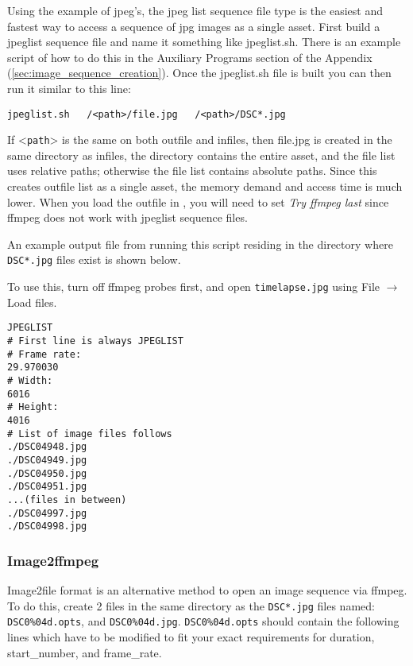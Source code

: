 Using the example of jpeg’s, the jpeg list sequence file type is the easiest and fastest way to access a sequence of jpg images as a single asset.  First build a jpeglist sequence file and name it something like jpeglist.sh.  There is an example script of how to do this in the Auxiliary Programs section of the Appendix (\ref{sec:image_sequence_creation}).  Once the jpeglist.sh file is built you can then run it similar to this line:

\begin{lstlisting}[style=sh]
jpeglist.sh   /<path>/file.jpg   /<path>/DSC*.jpg
\end{lstlisting}

\vspace*{1ex} \noindent If <\texttt{path}> is the same on both outfile and infiles, then file.jpg is created in the same directory as infiles, the directory contains the entire asset, and the file list uses relative paths; otherwise the file list contains absolute paths.   Since this creates outfile list as a single asset, the memory demand and access time is much lower.  When you load the outfile in \CGG{}, you will need to set \textit{Try ffmpeg last} since ffmpeg does not work with jpeglist sequence files.

An example output file from running this script residing in the directory where \texttt{DSC*.jpg} files exist is shown below.

To use this, turn off ffmpeg probes first, and open \texttt{timelapse.jpg} using File $\rightarrow$ Load files.

\begin{lstlisting}[style=sh,caption={Example: timelapse.jpg},captionpos=t]
JPEGLIST
# First line is always JPEGLIST
# Frame rate:
29.970030
# Width:
6016
# Height:
4016
# List of image files follows
./DSC04948.jpg
./DSC04949.jpg
./DSC04950.jpg
./DSC04951.jpg
...(files in between)
./DSC04997.jpg
./DSC04998.jpg
\end{lstlisting}

\subsubsection{Image2ffmpeg}%
\label{ssub:image2ffmpeg}

Image2file format is an alternative method to open an image sequence via ffmpeg.  To do this, create 2 files in the same directory as the \texttt{DSC*.jpg} files named:  \texttt{DSC0\%04d.opts}, and \texttt{DSC0\%04d.jpg}. 
\texttt{DSC0\%04d.opts} should contain the following lines which have to be modified to fit your exact requirements for duration, start\_number, and frame\_rate.


